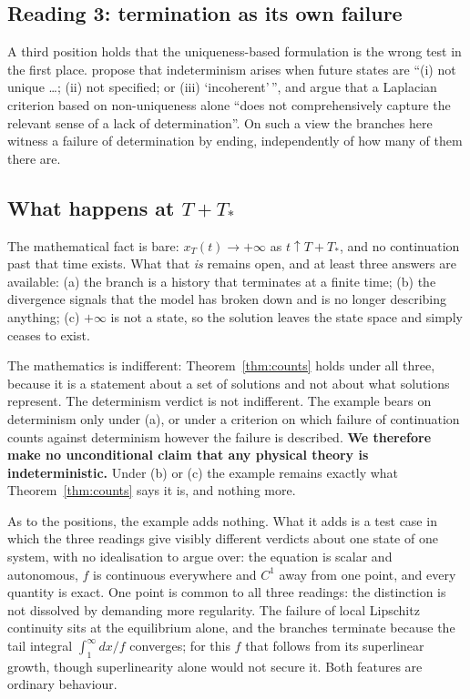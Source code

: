 \documentclass[12pt]{article}
\theoremstyle{plain}
\theoremstyle{definition}
\theoremstyle{remark}
\begin{document}
\subsection*{Reading 3: termination as its own failure}

A third position holds that the uniqueness-based formulation is the wrong test
in the first place. \citet{AzharNamjoo} propose that
indeterminism arises when future states are ``(i) not unique \dots; (ii) not
specified; or (iii) `incoherent'\,'', and argue that a Laplacian criterion based
on non-uniqueness alone ``does not comprehensively capture the relevant sense of
a lack of determination''. On such a view the branches here witness a failure of
determination by ending, independently of how many of them there are.

\subsection*{What happens at $T+T_{*}$}

The mathematical fact is bare: $x_{T}(t)\to+\infty$ as $t\uparrow T+T_{*}$, and
no continuation past that time exists. What that \emph{is} remains open, and at
least three answers are available: (a) the branch is a history that terminates
at a finite time; (b) the divergence signals that the model has broken down and
is no longer describing anything; (c) $+\infty$ is not a state, so the solution
leaves the state space and simply ceases to exist.

The mathematics is indifferent: Theorem~\ref{thm:counts} holds under all three,
because it is a statement about a set of solutions and not about what solutions
represent. The determinism verdict is not indifferent. The example bears on
determinism only under (a), or under a criterion on which failure of
continuation counts against determinism however the failure is described.
\textbf{We therefore make no unconditional claim that any physical theory is
indeterministic.} Under (b) or (c) the example remains exactly what
Theorem~\ref{thm:counts} says it is, and nothing more.

As to the positions, the example adds nothing. What it adds is a test case in
which the three readings give visibly different verdicts about one state of one
system, with no idealisation to argue over: the equation is scalar and
autonomous, $f$ is continuous everywhere and $C^{1}$ away from one point, and
every quantity is exact. One point is common to all three readings: the
distinction is not dissolved by demanding more regularity. The failure of local
Lipschitz continuity sits at the equilibrium alone, and the branches terminate
because the tail integral $\int_{1}^{\infty}dx/f$ converges; for this $f$ that
follows from its superlinear growth, though superlinearity alone would not
secure it. Both features are ordinary behaviour.
\end{document}
